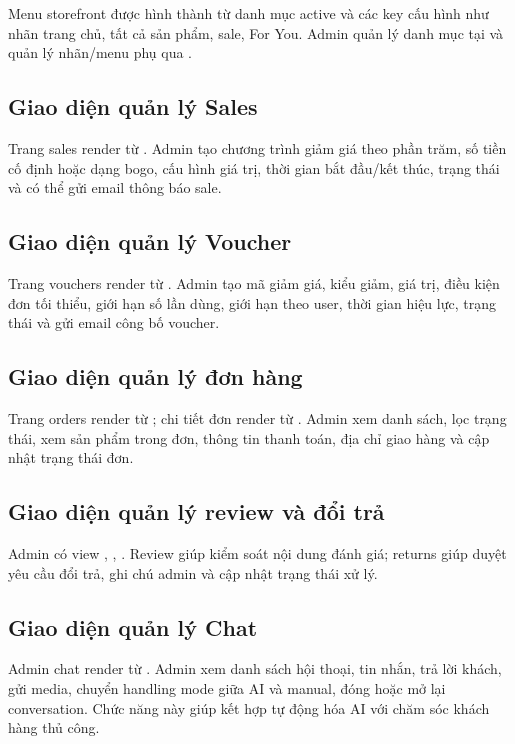 \documentclass[12pt,a4paper]{report}
\begin{document}
Menu storefront được hình thành từ danh mục active và các key cấu hình như nhãn trang chủ, tất cả sản phẩm, sale, For You. Admin quản lý danh mục tại  và quản lý nhãn/menu phụ qua .

\subsection{Giao diện quản lý Sales}

Trang sales render từ . Admin tạo chương trình giảm giá theo phần trăm, số tiền cố định hoặc dạng bogo, cấu hình giá trị, thời gian bắt đầu/kết thúc, trạng thái và có thể gửi email thông báo sale.

\subsection{Giao diện quản lý Voucher}

Trang vouchers render từ . Admin tạo mã giảm giá, kiểu giảm, giá trị, điều kiện đơn tối thiểu, giới hạn số lần dùng, giới hạn theo user, thời gian hiệu lực, trạng thái và gửi email công bố voucher.

\subsection{Giao diện quản lý đơn hàng}

Trang orders render từ ; chi tiết đơn render từ . Admin xem danh sách, lọc trạng thái, xem sản phẩm trong đơn, thông tin thanh toán, địa chỉ giao hàng và cập nhật trạng thái đơn.

\subsection{Giao diện quản lý review và đổi trả}

Admin có view , , . Review giúp kiểm soát nội dung đánh giá; returns giúp duyệt yêu cầu đổi trả, ghi chú admin và cập nhật trạng thái xử lý.

\subsection{Giao diện quản lý Chat}

Admin chat render từ . Admin xem danh sách hội thoại, tin nhắn, trả lời khách, gửi media, chuyển handling mode giữa AI và manual, đóng hoặc mở lại conversation. Chức năng này giúp kết hợp tự động hóa AI với chăm sóc khách hàng thủ công.
\end{document}
